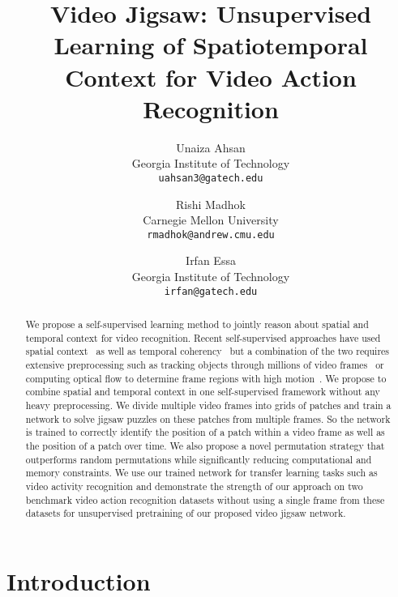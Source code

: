 \documentclass[10pt,twocolumn,letterpaper]{article}
\begin{document}
\title{Video Jigsaw: Unsupervised Learning of Spatiotemporal Context for Video Action Recognition}

\author{Unaiza Ahsan \\
Georgia Institute of Technology\\
{\tt\small uahsan3@gatech.edu}
\and
Rishi Madhok \\
Carnegie Mellon University\\
{\tt\small rmadhok@andrew.cmu.edu}
\and
Irfan Essa \\
Georgia Institute of Technology\\
{\tt\small irfan@gatech.edu}
}

\maketitle
\ifwacvfinal\thispagestyle{empty}\fi

\begin{abstract}
   We propose a self-supervised learning method to jointly reason about spatial and temporal context for video recognition. Recent self-supervised approaches have used spatial context~\cite{doersch2015unsupervised,noroozi2016unsupervised} as well as temporal coherency~\cite{misra2016shuffle} but a combination of the two requires extensive preprocessing such as tracking objects through millions of video frames~\cite{wang2017transitive} or computing optical flow to determine frame regions with high motion~\cite{lee2017unsupervised}. We propose to combine spatial and temporal context in one self-supervised framework without any heavy preprocessing. We divide multiple video frames into grids of patches and train a network to solve jigsaw puzzles on these patches from multiple frames. So the network is trained to correctly identify the position of a patch within a video frame as well as the position of a patch over time. We also propose a novel permutation strategy that outperforms random permutations while significantly reducing computational and memory constraints. We use our trained network for transfer learning tasks such as video activity recognition and demonstrate the strength of our approach on two benchmark video action recognition datasets without using a single frame from these datasets for unsupervised pretraining of our proposed video jigsaw network.
\end{abstract}

\section{Introduction}
\end{document}

